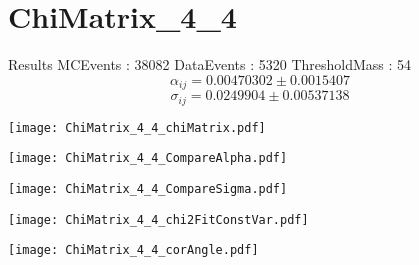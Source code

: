 \documentclass[a4paper,12pt]{article}
\begin{document}
\section{ChiMatrix\_4\_4}
\begin{minipage}{0.49\linewidth} Results \newline
MCEvents : 38082\newline
DataEvents : 5320 \newline
ThresholdMass : 54\\
$$\alpha_{ij} = 0.00470302\pm 0.0015407$$
$$\sigma_{ij} = 0.0249904\pm 0.00537138$$
\end{minipage}\hfill
\begin{minipage}{0.49\linewidth} 
\texttt{[image: ChiMatrix\_4\_4\_chiMatrix.pdf]}\\
\end{minipage}
\hfill
\begin{minipage}{0.49\linewidth} 
\texttt{[image: ChiMatrix\_4\_4\_CompareAlpha.pdf]}\\
\end{minipage}
\hfill
\begin{minipage}{0.49\linewidth} 
\texttt{[image: ChiMatrix\_4\_4\_CompareSigma.pdf]}\\
\end{minipage}
\begin{minipage}{0.49\linewidth} 
\texttt{[image: ChiMatrix\_4\_4\_chi2FitConstVar.pdf]}\\
\end{minipage}
\hfill
\begin{minipage}{0.49\linewidth} 
\texttt{[image: ChiMatrix\_4\_4\_corAngle.pdf]}\\
\end{minipage}
\end{document}
